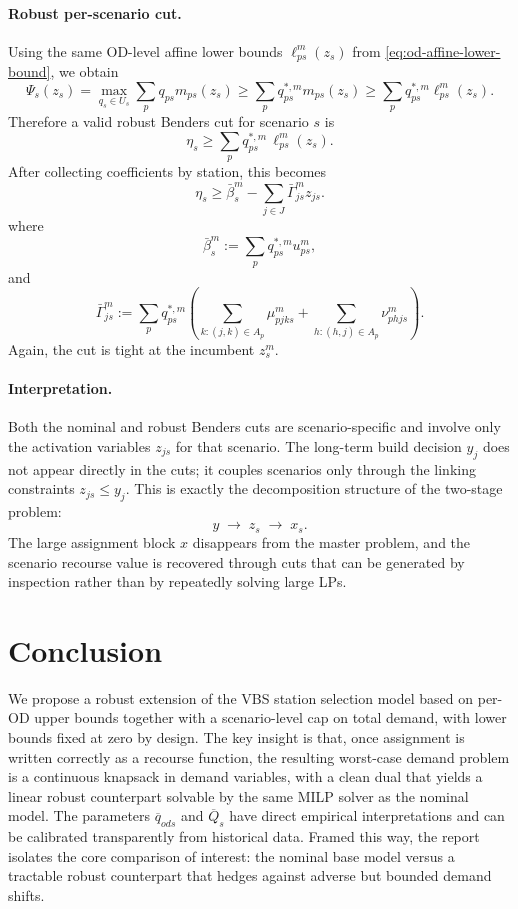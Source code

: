 \documentclass[11pt]{article}
\theoremstyle{definition}
\begin{document}
\paragraph{Robust per-scenario cut.}
Using the same OD-level affine lower bounds \(\ell_{ps}^m(z_s)\) from
\eqref{eq:od-affine-lower-bound}, we obtain
\[
	\Psi_s(z_s)
	=
	\max_{q_s\in U_s}\sum_p q_{ps}m_{ps}(z_s)
	\ge
	\sum_p q_{ps}^{*,m} m_{ps}(z_s)
	\ge
	\sum_p q_{ps}^{*,m} \ell_{ps}^m(z_s).
\]
Therefore a valid robust Benders cut for scenario \(s\) is
\begin{equation}
	\eta_s
	\ge
	\sum_p q_{ps}^{*,m}\,\ell_{ps}^m(z_s).
	\label{eq:robust-scenario-cut-expanded}
\end{equation}
After collecting coefficients by station, this becomes
\begin{equation}
	\eta_s
	\ge
	\bar\beta_s^m
	-
	\sum_{j\in J}\bar\Gamma_{js}^m z_{js}.
	\label{eq:robust-scenario-cut}
\end{equation}
where
\[
	\bar\beta_s^m := \sum_p q_{ps}^{*,m}u_{ps}^m,
\]
and
\[
	\bar\Gamma_{js}^m
	:=
	\sum_p q_{ps}^{*,m}
	\left(
	\sum_{k:(j,k)\in A_p}\mu_{pjks}^m
	+
	\sum_{h:(h,j)\in A_p}\nu_{phjs}^m
	\right).
\]
Again, the cut is tight at the incumbent \(z_s^m\).

\paragraph{Interpretation.}
Both the nominal and robust Benders cuts are scenario-specific and involve only
the activation variables \(z_{js}\) for that scenario. The long-term build
decision \(y_j\) does not appear directly in the cuts; it couples scenarios only
through the linking constraints \(z_{js}\le y_j\). This is exactly the
decomposition structure of the two-stage problem:
\[
	y \;\rightarrow\; z_s \;\rightarrow\; x_s.
\]
The large assignment block \(x\) disappears from the master problem, and the
scenario recourse value is recovered through cuts that can be generated by
inspection rather than by repeatedly solving large LPs.

\section{Conclusion}
\label{sec:conclusion}

We propose a robust extension of the VBS station selection model based on
per-OD upper bounds together with a scenario-level cap on total demand, with
lower bounds fixed at zero by design.  The key insight is that, once assignment
is written correctly as a recourse function, the resulting worst-case demand
problem is a continuous knapsack in demand variables, with a clean dual that
yields a linear robust counterpart solvable by the same MILP solver as the
nominal model.  The parameters $\overline{q}_{ods}$ and $\overline{Q}_s$ have
direct empirical interpretations and can be calibrated transparently from
historical data.  Framed this way, the report isolates the core comparison of
interest: the nominal base model versus a tractable robust counterpart that
hedges against adverse but bounded demand shifts.
\end{document}
